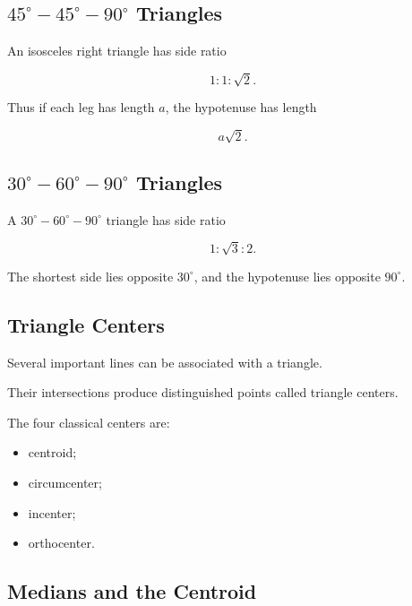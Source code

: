 \subsection{\(45^\circ-45^\circ-90^\circ\) Triangles}
\label{subsec:45-45-90}

An isosceles right triangle has side ratio

\[ \boxed{1:1:\sqrt2.} \]

Thus if each leg has length \(a\), the hypotenuse has length

\[ a\sqrt2. \]

\subsection{\(30^\circ-60^\circ-90^\circ\) Triangles}
\label{subsec:30-60-90}

A \(30^\circ-60^\circ-90^\circ\) triangle has side ratio

\[ \boxed{1:\sqrt3:2.} \]

The shortest side lies opposite \(30^\circ\), and the hypotenuse lies
opposite \(90^\circ\).

\subsection{Triangle Centers}
\label{subsec:triangle-centers}

Several important lines can be associated with a triangle.

Their intersections produce distinguished points called triangle centers.

The four classical centers are:

\begin{itemize}
    \item centroid;
    \item circumcenter;
    \item incenter;
    \item orthocenter.
\end{itemize}

\subsection{Medians and the Centroid}
\label{subsec:medians-centroid}

